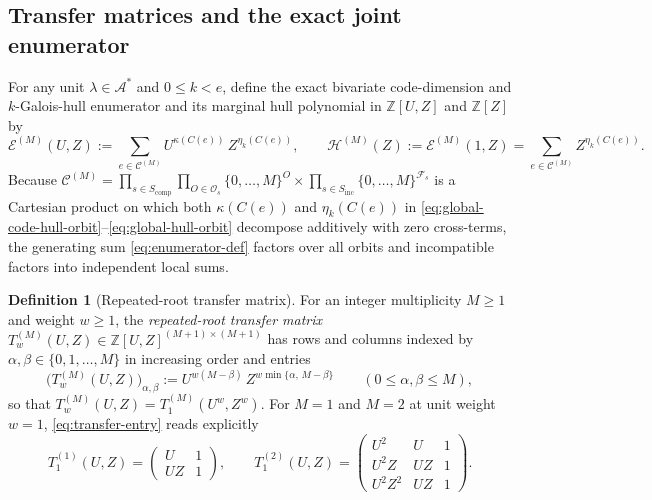 \documentclass[preprint,12pt]{elsarticle}
\newcommand{\Z}{\mathbb Z}
\newcommand{\A}{\mathcal A}
\newcommand{\Fs}{\mathcal F_s}
\newcommand{\Os}{\mathcal O_s}
\newcommand{\Epoly}{\mathscr E}
\newcommand{\Hpoly}{\mathscr H}
\numberwithin{equation}{section}
\theoremstyle{plain}
\theoremstyle{definition}
\newtheorem{definition}[theorem]{Definition}
\theoremstyle{remark}
\begin{document}
\subsection{Transfer matrices and the exact joint enumerator}\label{sec:transfer}

For any unit $\lambda\in\A^*$ and $0\le k<e$, define the exact bivariate
code-dimension and $k$-Galois-hull enumerator and its marginal hull polynomial in
$\Z[U,Z]$ and $\Z[Z]$ by
\begin{equation}\label{eq:enumerator-def}
\Epoly^{(M)}(U,Z):=\sum_{e\in\mathscr C^{(M)}} U^{\kappa(C(e))}\,Z^{\eta_k(C(e))},
\qquad
\Hpoly^{(M)}(Z):=\Epoly^{(M)}(1,Z)=\sum_{e\in\mathscr C^{(M)}} Z^{\eta_k(C(e))}.
\end{equation}
Because $\mathscr C^{(M)}=\prod_{s\in S_{\mathrm{comp}}}\prod_{O\in\Os}
\{0,\dots,M\}^O\times\prod_{s\in S_{\mathrm{inc}}}\{0,\dots,M\}^{\Fs}$ is a
Cartesian product on which both $\kappa(C(e))$ and $\eta_k(C(e))$ in
\eqref{eq:global-code-hull-orbit}--\eqref{eq:global-hull-orbit} decompose
additively with zero cross-terms, the generating sum \eqref{eq:enumerator-def}
factors over all orbits and incompatible factors into independent local sums.

\begin{definition}[Repeated-root transfer matrix]\label{def:transfer-matrix}
For an integer multiplicity $M\ge 1$ and weight $w\ge 1$, the \emph{repeated-root
transfer matrix} $T_w^{(M)}(U,Z)\in\Z[U,Z]^{(M+1)\times(M+1)}$ has rows and
columns indexed by $\alpha,\beta\in\{0,1,\dots,M\}$ in increasing order and
entries
\begin{equation}\label{eq:transfer-entry}
\bigl(T_w^{(M)}(U,Z)\bigr)_{\alpha,\beta}
 :=U^{w(M-\beta)}\,Z^{w\min\{\alpha,\,M-\beta\}}
 \qquad(0\le\alpha,\beta\le M),
\end{equation}
so that $T_w^{(M)}(U,Z)=T_1^{(M)}(U^w,Z^w)$. For $M=1$ and $M=2$ at unit weight
$w=1$, \eqref{eq:transfer-entry} reads explicitly
\begin{equation}\label{eq:T1-T2}
T_1^{(1)}(U,Z)=
\begin{pmatrix}
U & 1 \\
UZ & 1
\end{pmatrix},
\qquad
T_1^{(2)}(U,Z)=
\begin{pmatrix}
U^2 & U & 1 \\
U^2 Z & UZ & 1 \\
U^2 Z^2 & UZ & 1
\end{pmatrix}.
\end{equation}
\end{definition}
\end{document}
